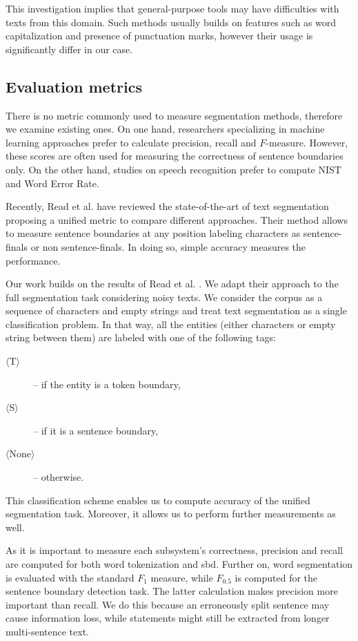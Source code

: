 This investigation implies that general-purpose tools may have difficulties with texts from this domain. 
Such methods usually builds on features such as word capitalization and presence of punctuation marks, however their usage is significantly differ in our case. 

\subsection{Evaluation metrics}
\label{sec:metric}

There is no metric commonly used to measure segmentation methods, therefore we examine existing ones.
On one hand, researchers specializing in machine learning approaches prefer to calculate precision, recall and $F$-measure. 
However, these scores are often used for measuring the correctness of sentence boundaries only.
On the other hand, studies on speech recognition prefer to compute NIST and Word Error Rate. 

Recently, Read et al. have reviewed \cite{read2012sentence} the state-of-the-art of text segmentation proposing a unified metric to compare different approaches. 
Their method allows to measure sentence boundaries at any position labeling characters as sentence-finals or non sentence-finals. 
In doing so, simple accuracy measures the performance. 

Our work builds on the results of Read et al. \cite{read2012sentence}. 
We adapt their approach to the full segmentation task considering noisy texts. 
We consider the corpus as a sequence of characters and empty strings and treat text segmentation as a single classification problem. 
In that way, all the entities (either characters or empty string between them) are labeled with one of the following tags: 
\begin{description}
 \item[$\langle$T$\rangle$] --  if the entity is a token boundary,
 \item[$\langle$S$\rangle$] -- if it is a sentence boundary,
 \item[$\langle$None$\rangle$] -- otherwise.
\end{description}
This classification scheme enables us to compute accuracy of the unified segmentation task. 
Moreover, it allows us to perform further measurements as well.

As it is important to measure each subsystem's correctness, precision and recall are computed for both word tokenization and \acrshort{sbd}. 
Further on, word segmentation is evaluated with the standard $F_1$ measure, while $F_{0.5}$ is computed for the sentence boundary detection task. 
The latter calculation makes precision more important than recall. %
We do this because an erroneously split sentence may cause information loss\label{sec:loss}, while statements might still be extracted from longer multi-sentence text. 

